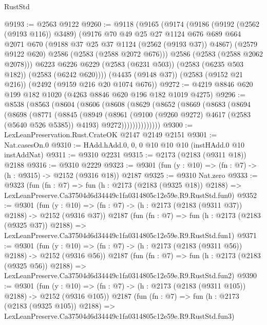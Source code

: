 \begin{lexlean}{RustStd}
\begin{coremodule}
@9193 := @2563 @9122
@9260 := @9118
    (@9165
      (@9174
        (@9186
          (@9192 (@2562 (@9193 @116)) @3489)
          (@9176
            @70
            @49
            @25
            @27
            @1124
            @676
            @689
            @664
            @2071
            @670
            (@9188 @37 @25 @37 @1124 (@2562 (@9193 @37)) @4867)
            (@2579 @9122 @620)
            @2586
            (@2583 (@2588 @2072 @676)))
          @2586
          (@2583 (@2588 @2062 @2078)))
        @6223
        @6226
        @6229
        (@2583 (@6231 @503))
        (@2583 (@6235 @503 @182))
        (@2583 (@6242 @620))))
    (@4435 (@9148 @37))
    (@2583 (@9152 @21 @216))
    (@2492 (@9159 @216 @20 @1074 @676))
@9272 := @4219 @8846 @620 @199 @182 @1020 (@4263 @8846 @620 @196 @182 @1019 @4275)
@9296 := @8538
    (@8563
      (@8604
        (@8606
          (@8608
            (@8629
              (@8652
                (@8669
                  (@8683
                    (@8694
                      (@8698
                        (@8771
                          (@8845
                            (@8949
                              (@8961
                                (@9100 (@9260 @9272) @4617 (@2583 (@5640 @526 @5385)) @4193)
                                @9272))))))))))))))
@9300 := LexLeanPreservation.Rust.CrateOK @2147 @2149 @2151
@9301 := Nat.casesOn.{0}
@9310 := HAdd.hAdd.{0, 0, 0} @10 @10 @10 (instHAdd.{0} @10 instAddNat)
@9311 := @9310 @2231
@9315 := @2173 (@2183 (@9311 @18)) @2188
@9316 := @9310 @2229
@9323 := @9301 (fun (y : @10) => (fn : @7) -> (h : @9315) -> @2152 (@9316 @18)) @2187
@9325 := @9310 Nat.zero
@9333 := @9323
    (fun (fn : @7) =>
    fun (h : @2173 (@2183 (@9325 @18)) @2188) =>
    LexLeanPreserve.Ca37504d6d34449c1fa0314805c12e59e.R9.RustStd.fun0)
@9352 := @9301
    (fun (y : @10) => (fn : @7) -> (h : @2173 (@2183 (@9311 @37)) @2188) -> @2152 (@9316 @37))
    @2187
    (fun (fn : @7) =>
    fun (h : @2173 (@2183 (@9325 @37)) @2188) =>
    LexLeanPreserve.Ca37504d6d34449c1fa0314805c12e59e.R9.RustStd.fun1)
@9371 := @9301
    (fun (y : @10) => (fn : @7) -> (h : @2173 (@2183 (@9311 @56)) @2188) -> @2152 (@9316 @56))
    @2187
    (fun (fn : @7) =>
    fun (h : @2173 (@2183 (@9325 @56)) @2188) =>
    LexLeanPreserve.Ca37504d6d34449c1fa0314805c12e59e.R9.RustStd.fun2)
@9390 := @9301
    (fun (y : @10) => (fn : @7) -> (h : @2173 (@2183 (@9311 @105)) @2188) -> @2152 (@9316 @105))
    @2187
    (fun (fn : @7) =>
    fun (h : @2173 (@2183 (@9325 @105)) @2188) =>
    LexLeanPreserve.Ca37504d6d34449c1fa0314805c12e59e.R9.RustStd.fun3)

\end{coremodule}
\end{lexlean}
